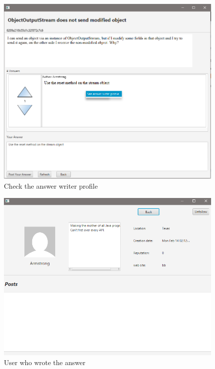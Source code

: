 \documentclass[11pt]{report}
\begin{document}
\begin{figure}[H]
  \centering
  \includegraphics[width=\textwidth,keepaspectratio=true]{img/user_manual/ContextMenuAnswer2.png}
  \caption{Check the answer writer profile}
  \label{fig:ContextMenuAnswer2}
\end{figure}
\begin{figure}[H]
  \centering
  \includegraphics[width=\textwidth,keepaspectratio=true]{img/user_manual/ContextMenuAnswer3.png}
  \caption{User who wrote the answer}
  \label{fig:ContextMenuAnswer3}
\end{figure}
\end{document}
